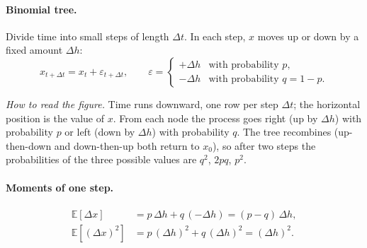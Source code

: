 \paragraph{Binomial tree.} Divide time into small steps of length $\Delta t$. In each step, $x$ moves up or down by a fixed amount $\Delta h$:
\[
x_{t+\Delta t}=x_t+\varepsilon_{t+\Delta t},\qquad \varepsilon=\begin{cases}+\Delta h&\text{with probability }p,\\-\Delta h&\text{with probability }q=1-p.\end{cases}
\]

\begin{center}
\end{center}
\textit{How to read the figure.} Time runs downward, one row per step $\Delta t$; the horizontal position is the value of $x$. From each node the process goes right (up by $\Delta h$) with probability $p$ or left (down by $\Delta h$) with probability $q$. The tree recombines (up-then-down and down-then-up both return to $x_0$), so after two steps the probabilities of the three possible values are $q^2$, $2pq$, $p^2$.

\paragraph{Moments of one step.}
\begin{align*}
\mathbb{E}[\Delta x]&=p\,\Delta h+q\,(-\Delta h)=(p-q)\,\Delta h,\\
\mathbb{E}[(\Delta x)^2]&=p\,(\Delta h)^2+q\,(\Delta h)^2=(\Delta h)^2.
\end{align*}
